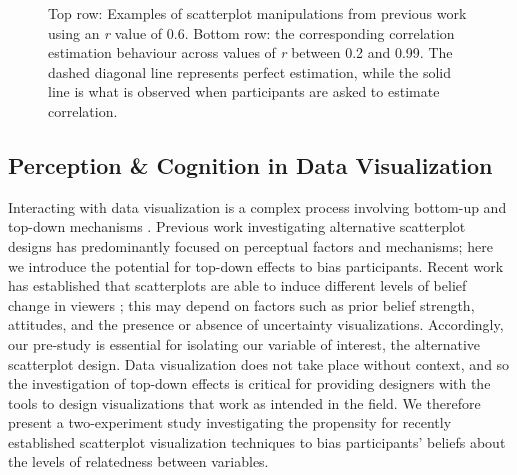 \documentclass[manuscript,screen,review,anonymous]{acmart}
\begin{document}
\begin{figure}


\caption{\label{fig-previous-manipulations}Top row: Examples of
scatterplot manipulations from previous work using an \textit{r} value
of 0.6. Bottom row: the corresponding correlation estimation behaviour
across values of \textit{r} between 0.2 and 0.99. The dashed diagonal
line represents perfect estimation, while the solid line is what is
observed when participants are asked to estimate correlation.}

\end{figure}%

\subsection{Perception \& Cognition in Data
Visualization}\label{sec-perception-cognition}

Interacting with data visualization is a complex process involving
bottom-up and top-down mechanisms
\citep{shah_2011, franconeri_2021, xiong_2022}. Previous work
investigating alternative scatterplot designs has predominantly focused
on perceptual factors and mechanisms; here we introduce the potential
for top-down effects to bias participants. Recent work has established
that scatterplots are able to induce different levels of belief change
in viewers \citep{karduni_2020, markant_2023}; this may depend on
factors such as prior belief strength, attitudes, and the presence or
absence of uncertainty visualizations. Accordingly, our pre-study is
essential for isolating our variable of interest, the alternative
scatterplot design. Data visualization does not take place without
context, and so the investigation of top-down effects is critical for
providing designers with the tools to design visualizations that work as
intended in the field. We therefore present a two-experiment study
investigating the propensity for recently established scatterplot
visualization techniques to bias participants' beliefs about the levels
of relatedness between variables.
\end{document}
